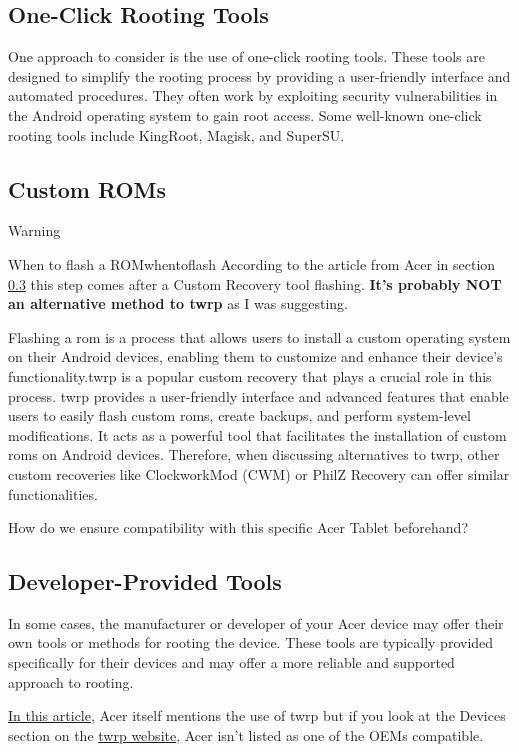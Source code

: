 \subsection{One-Click Rooting Tools}

One approach to consider is the use of one-click rooting tools. These tools are designed to simplify the rooting process by providing a user-friendly interface and automated procedures. They often work by exploiting security vulnerabilities in the Android operating system to gain root access. Some well-known one-click rooting tools include KingRoot, Magisk, and SuperSU.

\subsection{Custom ROMs}
Warning \faRadiation

\begin{mydef}{When to flash a ROM}{whentoflash}
According to the article from Acer in section \ref{subsec:dev-tools} this step comes after a Custom Recovery tool flashing. \textbf{It's probably NOT an alternative method to \gls{twrp}} as I was suggesting.
\end{mydef}

Flashing a \gls{rom} is a process that allows users to install a custom operating system on their Android devices, enabling them to customize and enhance their device's functionality.\gls{twrp} is a popular custom recovery that plays a crucial role in this process. \gls{twrp} provides a user-friendly interface and advanced features that enable users to easily flash custom \gls{rom}s, create backups, and perform system-level modifications. It acts as a powerful tool that facilitates the installation of custom \gls{rom}s on Android devices. Therefore, when discussing alternatives to \gls{twrp}, other custom recoveries like ClockworkMod (CWM) or PhilZ Recovery can offer similar functionalities.


How do we ensure compatibility with this specific Acer Tablet beforehand?

\subsection{Developer-Provided Tools}
\label{subsec:dev-tools}
In some cases, the manufacturer or developer of your Acer device may offer their own tools or methods for rooting the device. These tools are typically provided specifically for their devices and may offer a more reliable and supported approach to rooting.

\href{https://blog.acer.com/en/discussion/616/rooting-your-phone-your-complete-guide-2023}{In this article}, Acer itself mentions the use of \gls{twrp} but if you look at the Devices section on the \href{https://twrp.me/Devices/}{\gls{twrp} website}, Acer isn't listed as one of the OEMs compatible. \faHospital


